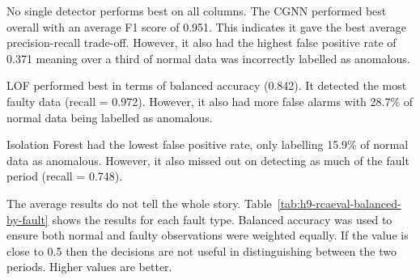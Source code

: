 



No single detector performs best on all columns. The CGNN performed best overall with an average F1 score of 0.951. This indicates it gave the best average precision-recall trade-off. However, it also had the highest false positive rate of 0.371 meaning over a third of normal data was incorrectly labelled as anomalous.

LOF performed best in terms of balanced accuracy (0.842). It detected the most faulty data (recall = 0.972). However, it also had more false alarms with 28.7\% of normal data being labelled as anomalous.

Isolation Forest had the lowest false positive rate, only labelling 15.9\% of normal data as anomalous. However, it also missed out on detecting as much of the fault period (recall = 0.748).

The average results do not tell the whole story. Table~\ref{tab:h9-rcaeval-balanced-by-fault} shows the results for each fault type. Balanced accuracy was used to ensure both normal and faulty observations were weighted equally. If the value is close to 0.5 then the decisions are not useful in distinguishing between the two periods. Higher values are better.

